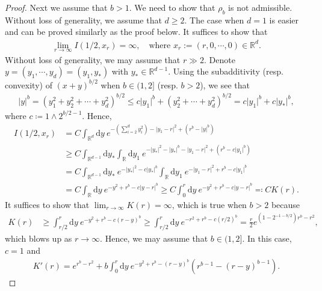 \documentclass[sn-mathphys]{sn-jnl}%
\renewcommand{\R}{\mathbb{R}}
\newcommand{\ud}{\ensuremath{\mathrm{d}}}
\numberwithin{equation}{section}
\theoremstyle{thmstyleone}%
\theoremstyle{thmstyletwo}%
\theoremstyle{thmstylethree}%
\begin{document}
\begin{proof}
  Next we assume that $b>1$. We need to show that $\rho_b$ is not admissible. Without loss of
  generality, we assume that $d\ge 2$. The case when $d = 1$ is easier and can be proved similarly
  as the proof below. It suffices to show that
	\begin{align*}
    \lim_{r\to\infty} I(1/2,x_r) = \infty, \quad \text{where $x_r:=(r,0,\cdots,0)\in\R^d$.}
	\end{align*}
  Without loss of generality, we may assume that $r\gg 2$. Denote $y=(y_1,\cdots, y_d) = (y_1,y_*)$
  with $y_*\in\R^{d-1}$. Using the subadditivity (resp. convexity) of $(x+y)^{b/2}$ when $b\in
  (1,2]$ (resp. $b>2$), we see that
	\begin{align*} %
	\lvert  y  \rvert ^b =  \left(y_1^2+y_2^2+\cdots+y_d^2\right)^{b/2}
	\le c \lvert y_1 \rvert^b + \left(y_2^2+\cdots+y_d^2\right)^{b/2}
	=   c \lvert y_1 \rvert^b + c \lvert y_* \rvert^b,
	\end{align*}
  where $c \coloneqq 1 \wedge 2^{b/2 -1}$. Hence,
	\begin{align*}
    I\left(1/2,x_r\right)
    & =   C \int_{\R^d} \ud y\: e^{- \left(\sum_{i = 2}^{d} y_i^2\right) - \lvert y_1-r \rvert^2 + (r^b - \lvert y \rvert^b)}                                     \\
    & \ge C \int_{\R^{d-1}}\ud y_* \int_\R \ud y_1\: e^{- \lvert y_* \rvert^2 -\lvert y_* \rvert^b - \lvert y_1-r \rvert^2 + (r^b - c \lvert y_1 \rvert^b)}     \\
    & =   C \int_{\R^{d-1}}\ud y_* \: e^{- \lvert y_* \rvert^2 -c \lvert y_* \rvert^b} \int_\R \ud y_1\: e^{- \lvert y_1-r \rvert^2 + r^b - c\lvert y_1 \rvert^b} \\
    & =   C \int_\R  \ud y\: e^{- y^2 + r^b - c \lvert y-r \rvert^b}
      \ge C \int_0^r \ud y\: e^{- y^2 + r^b - c \lvert y-r \rvert^b} \eqqcolon C K(r).
  \end{align*}
  It suffices to show that $\lim_{r\to\infty}K(r) = \infty$, which is true when $b>2$ because
  \begin{align*}
    K(r)
    & \ge \int_{r/2}^{r} \ud y\: e^{-y^2 +r^b - c (r-y)^b}
      \ge \int_{r/2}^{r} \ud y\: e^{-r^2 +r^b - c (r/2)^b}
    = \frac{r}{2} e^{ \left(1-2^{-1-b/2}\right)r^b -r^2 },
	\end{align*}
  which blows up as $r\to \infty$. Hence, we may assume that $b\in (1,2]$. In this case, $c=1$ and
	\begin{align*}
    K'(r) = e^{r^b-r^2} + b \int_0^r \ud y\: e^{ - y^2 + r^b - (r-y)^b} \left(r^{b-1}-(r-y)^{b-1}\right).
	\end{align*}

\end{proof}
\end{document}
